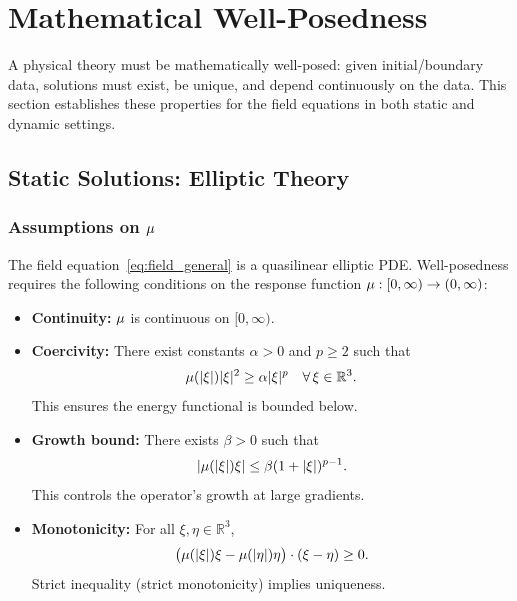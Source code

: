 
\section{Mathematical Well-Posedness}\label{sec:wellposed}

A physical theory must be mathematically well-posed: given initial/boundary 
data, solutions must exist, be unique, and depend continuously on the data. 
This section establishes these properties for the \DFD field equations in 
both static and dynamic settings.

\subsection{Static Solutions: Elliptic Theory}\label{sec:elliptic}

\subsubsection{Assumptions on $\mu$}

The field equation~\eqref{eq:field_general} is a quasilinear elliptic PDE. 
Well-posedness requires the following conditions on the response function 
$\mu: [0,\infty) \to (0,\infty)$:

\begin{itemize}
\item[\textbf{(A1)}] \textbf{Continuity:} $\mu$ is continuous on $[0,\infty)$.

\item[\textbf{(A2)}] \textbf{Coercivity:} There exist constants $\alpha > 0$ 
and $p \geq 2$ such that
\begin{equation}
\mu(|\xi|)|\xi|^2 \geq \alpha|\xi|^p \quad \forall\,\xi \in \mathbb{R}^3.
\end{equation}
This ensures the energy functional is bounded below.

\item[\textbf{(A3)}] \textbf{Growth bound:} There exists $\beta > 0$ such that
\begin{equation}
|\mu(|\xi|)\xi| \leq \beta(1 + |\xi|)^{p-1}.
\end{equation}
This controls the operator's growth at large gradients.

\item[\textbf{(A4)}] \textbf{Monotonicity:} For all $\xi, \eta \in \mathbb{R}^3$,
\begin{equation}
\big(\mu(|\xi|)\xi - \mu(|\eta|)\eta\big) \cdot (\xi - \eta) \geq 0.
\end{equation}
Strict inequality (strict monotonicity) implies uniqueness.
\end{itemize}

